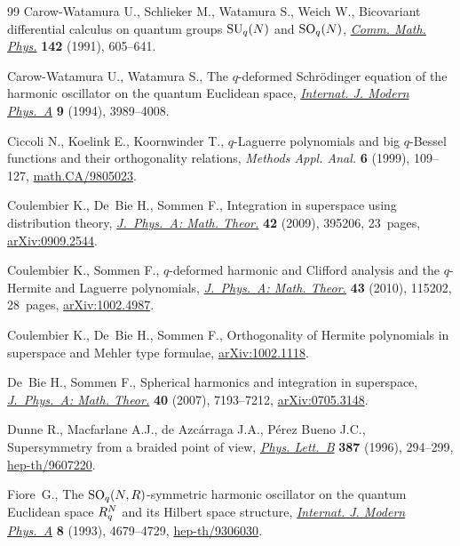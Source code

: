 \documentclass[pdftex]{sigma}
\numberwithin{equation}{section}
\begin{document}
\begin{thebibliography}{99}
Carow-Watamura U., Schlieker M., Watamura S., Weich W.,
Bicovariant dif\/ferential calculus on quantum groups ${\rm SU}_q(N)$ and ${\rm SO}_q(N)$,
\href{http://dx.doi.org/10.1007/BF02099103}{{\it Comm. Math. Phys.}} {\bf142} (1991), 605--641.

Carow-Watamura U., Watamura S.,
The $q$-deformed Schr\"odinger equation of the harmonic oscillator on the quantum Euclidean space,
\href{http://dx.doi.org/10.1142/S0217751X94001618}{{\it Internat. J. Modern Phys.~A}} {\bf 9} (1994), 3989--4008.

Ciccoli N., Koelink E., Koornwinder T.,
$q$-Laguerre polynomials and big $q$-Bessel functions and their orthogonality relations,
 {\it Methods Appl. Anal.} {\bf6} (1999), 109--127,
\href{http://arxiv.org/abs/math.CA/9805023}{math.CA/9805023}.

Coulembier K., De~Bie H., Sommen F.,
Integration in superspace using distribution theory,
\href{http://dx.doi.org/10.1088/1751-8113/42/39/395206}{{\it J.~Phys.~A: Math. Theor.}} {\bf42} (2009), 395206, 23~pages,
\href{http://arxiv.org/abs/0909.2544}{arXiv:0909.2544}.

Coulembier K., Sommen F.,
$q$-deformed harmonic and Clif\/ford analysis and the $q$-Hermite and Laguerre polynomials,
\href{http://dx.doi.org/10.1088/1751-8113/43/11/115202}{{\it  J.~Phys.~A: Math. Theor.}} {\bf 43} (2010), 115202, 28~pages,
\href{http://arxiv.org/abs/1002.4987}{arXiv:1002.4987}.

Coulembier K., De~Bie H., Sommen F.,
Orthogonality of Hermite polynomials in superspace and Mehler type formulae,
\href{http://arxiv.org/abs/1002.1118}{arXiv:1002.1118}.

De~Bie H., Sommen F.,
Spherical harmonics and integration in superspace,
\href{http://dx.doi.org/10.1088/1751-8113/40/26/007}{{\it J.~Phys.~A: Math. Theor.}} {\bf 40} (2007), 7193--7212,
\href{http://arxiv.org/abs/0705.3148}{arXiv:0705.3148}.

Dunne R., Macfarlane A.J., de Azc\'arraga J.A., P\'erez Bueno J.C.,
Supersymmetry from a braided point of view,
\href{http://dx.doi.org/10.1016/0370-2693(96)01032-5}{{\it Phys. Lett.~B}} {\bf387} (1996), 294--299,
\href{http://arxiv.org/abs/hep-th/9607220}{hep-th/9607220}.

Fiore~G.,
The ${\rm SO}\sb q(N,R)$-symmetric harmonic oscillator on the quantum Euclidean space $R\sp N\sb q$ and its Hilbert space structure,
\href{http://dx.doi.org/10.1142/S0217751X93001880}{{\it Internat. J. Modern Phys.~A}} {\bf 8} (1993), 4679--4729,
\href{http://arxiv.org/abs/hep-th/9306030}{hep-th/9306030}.


\end{thebibliography}
\end{document}
